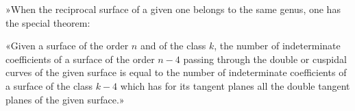 \documentclass{article}
\begin{document}
»When the reciprocal surface of a given one belongs to the same genus, one has the special theorem:

«Given a surface of the order $n$ and of the class $k$, the number of indeterminate coefficients of a surface of the order $n - 4$ passing through the double or cuspidal curves of the given surface is equal to the number of indeterminate coefficients of a surface of the class $k - 4$ which has for its tangent planes all the double tangent planes of the given surface.»
\end{document}
